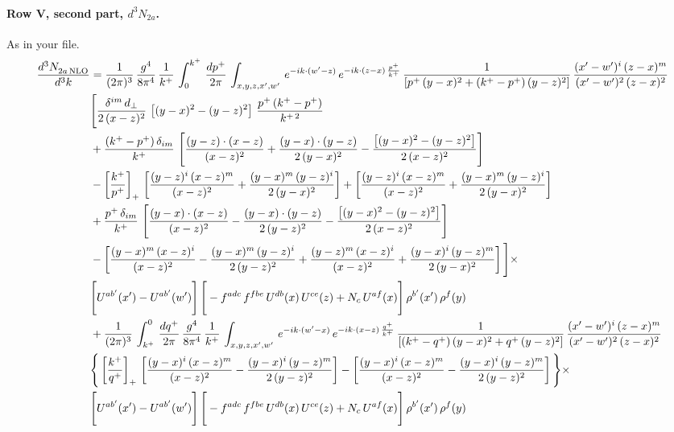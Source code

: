 \documentclass[10pt]{article}
\numberwithin{equation}{section}
\begin{document}
\paragraph{Row V, second part, $d^3N_{2a}$.}
As in your file.
\begin{align}
    \frac{d^{3}N_{2a\,\rm NLO}^{\rm}}{d^{3}k}  & =   \frac{1}{(2\pi)^{3}}\, \frac{g^{4}}{8\pi^{4}}\,\frac{1}{k^{+}}\,\int_{0}^{k^{+}}\, \frac{dp^{+}}{2\pi}\,\int_{x,y,z,x',w'}\,e^{-ik\cdot(w'-z)}\,e^{-ik\cdot (z-x)\,\frac{p^{+}}{k^{+}}}\,\frac{1}{\left[p^{+}\,(y-x)^{2}+(k^{+}-p^{+})\,(y-z)^{2}\right]}\, \frac{(x'-w')^{i}\,(z-x)^{m}}{(x'-w')^{2}\,(z-x)^{2}} \notag \\ & \Bigg[\frac{\delta^{im}\,d_{\perp}}{2\,(x-z)^{2}}\,\left[(y-x)^{2}-(y-z)^{2}\right]\,\frac{p^{+}\,(k^{+}-p^{+})}{k^{+\,2}}\notag \\ & +\frac{(k^{+}-p^{+})\,\delta_{im}}{k^{+}}\,\left[\frac{(y-z)\cdot (x-z)}{(x-z)^{2}}+\frac{(y-x)\cdot (y-z)}{2\,(y-x)^{2}}-\frac{\left[(y-x)^{2}-(y-z)^{2}\right]}{2\,(x-z)^{2}}\right]\notag \\ & -\left[\frac{k^{+}}{p^{+}}\right]_{+}\,\left[\frac{(y-z)^{i}\,(x-z)^{m}}{(x-z)^{2}}+\frac{(y-x)^{m}\,(y-z)^{i}}{2\,(y-x)^{2}}\right]+ \left[\frac{(y-z)^{i}\,(x-z)^{m}}{(x-z)^{2}}+\frac{(y-x)^{m}\,(y-z)^{i}}{2\,(y-x)^{2}}\right]\notag \\ & +\frac{p^{+}\,\delta_{im}}{k^{+}}\,\left[\frac{(y-x)\cdot (x-z)}{(x-z)^{2}}-\frac{(y-x)\cdot (y-z)}{2\,(y-z)^{2}}-\frac{\left[(y-x)^{2}-(y-z)^{2}\right]}{2\,(x-z)^{2}}\right]\notag \\ &-\left[\frac{(y-x)^{m}\,(x-z)^{i}}{(x-z)^{2}}-\frac{(y-x)^{m}\,(y-z)^{i}}{2\,(y-z)^{2}}+\frac{(y-z)^{m}\,(x-z)^{i}}{(x-z)^{2}}+\frac{(y-x)^{i}\,(y-z)^{m}}{2\,(y-x)^{2}}\right]\Bigg]\times \notag \\ & \Bigg[U^{ab'}(x')-U^{ab'}(w')\Bigg]\,\Bigg[-f^{adc}\,f^{fbe}\,U^{db}(x)\,U^{ce}(z)+N_{c}\,U^{af}(x)\Bigg]\,\rho^{b'}(x')\,\rho^{f}(y) \notag \\
& + \frac{1}{(2\pi)^{3}}\,\int^{0}_{k^{+}}\, \frac{dq^{+}}{2\pi} \,\frac{g^{4}}{8\pi^{4}}\,\frac{1}{k^{+}}\, \int_{x,y,z,x',w'}\,e^{-ik\cdot(w'-x)}\,e^{-ik\cdot (x-z)\,\frac{q^{+}}{k^{+}}}\, \frac{1}{\left[(k^{+}-q^{+})\,(y-x)^{2}+q^{+}\,(y-z)^{2}\right]}\, \frac{(x'-w')^{i}\,(z-x)^{m}}{(x'-w')^{2}\,(z-x)^{2}} \notag \\ &\Bigg\{\left[\frac{k^{+}}{q^{+}}\right]_{+}\,\left[\frac{(y-x)^{i}\,(x-z)^{m}}{(x-z)^{2}}-\frac{(y-x)^{i}\,(y-z)^{m}}{2\,(y-z)^{2}}\right] -\left[\frac{(y-x)^{i}\,(x-z)^{m}}{(x-z)^{2}}-\frac{(y-x)^{i}\,(y-z)^{m}}{2\,(y-z)^{2}}\right]\Bigg\}\times\,\notag \\ & \Bigg[U^{ab'}(x')-U^{ab'}(w')\Bigg]\,\Bigg[-f^{adc}\,f^{fbe}\,U^{db}(x)\,U^{ce}(z)+N_{c}\,U^{af}(x)\Bigg]\,\rho^{b'}(x')\,\rho^{f}(y) \label{eq:R:G1V2a}
\end{align}
\end{document}
